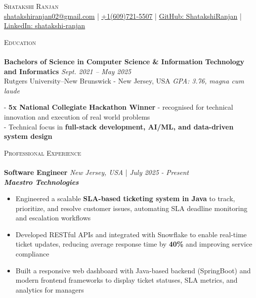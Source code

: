 \documentclass[a4paper]{article}
\newcommand{\lineunder} {
    \vspace*{-8pt} \\
    \hspace*{-18pt} \hrulefill \\
}
\newcommand{\header} [1] {
    {\hspace*{-18pt}\vspace*{6pt} \textsc{#1}}
    \vspace*{-6pt} \lineunder
}
\begin{document}
\vspace*{-35pt}

\begin{center}
{\Large \scshape Shatakshi Ranjan}\\
\vspace{2pt}
\small{ \href{mailto:shatakshiranjan02@gmail.com}{shatakshiranjan02@gmail.com}  | \href{tel:6097215507}{+1(609)721-5507} | \href{https://github.com/ShatakshiRanjan}{GitHub: ShatakshiRanjan}  | \href{https://www.linkedin.com/in/shatakshi-ranjan/}{LinkedIn: shatakshi-ranjan}}\\
\end{center}
\vspace{-4pt} 

%
%
\header{Education}
\textbf{Bachelors of Science in Computer Science \& Information Technology and Informatics} \hfill \textit{Sept. 2021 – May 2025} \\
Rutgers University–New Brunswick - New Jersey, USA \hfill \textit{GPA: 3.76, magna cum laude}

  \vspace{1mm}
  - \textbf{5x National Collegiate Hackathon Winner} - recognised for technical innovation and execution of real world problems \\
  - Technical focus in \textbf{full-stack development, AI/ML, and data-driven system design}  \\

  \vspace{1mm}
%
%
\header{Professional Experience}

\textbf{Software Engineer} \hfill \textit{New Jersey, USA} | \textit{July 2025 - Present} \\
\textit{\textbf{Maestro Technologies}}
\vspace{-2.5mm}
\begin{itemize} \itemsep -4pt
    \item Engineered a scalable \textbf{SLA-based ticketing system in Java} to track, prioritize, and resolve customer issues, automating SLA deadline monitoring and escalation workflows 
    \item Developed RESTful APIs and integrated with Snowflake to enable real-time ticket updates, reducing average response time by \textbf{40\%} and improving service compliance 
    \item Built a responsive web dashboard with Java-based backend (SpringBoot) and modern frontend frameworks to display ticket statuses, SLA metrics, and analytics for managers 
\end{itemize}
\vspace{-2mm}
\end{document}
